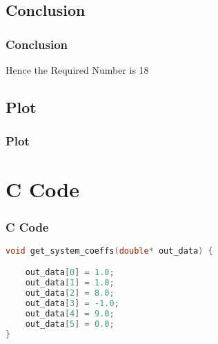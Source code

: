 \documentclass{beamer}
\theoremstyle{remark}
\numberwithin{equation}{section}
\begin{document}
\subsection{Conclusion}
\begin{frame}
\frametitle{Conclusion}
 Hence the Required Number is 18
\end{frame}
\subsection{Plot}
\begin{frame}[fragile]
\frametitle{Plot}
 
\end{frame}

\section{C Code}
\begin{frame}[fragile]
\frametitle{C Code}
\begin{lstlisting}[language=C]
void get_system_coeffs(double* out_data) {

    out_data[0] = 1.0;
    out_data[1] = 1.0;
    out_data[2] = 8.0;
    out_data[3] = -1.0;
    out_data[4] = 9.0;
    out_data[5] = 0.0;
}
    \end{lstlisting}
\end{frame}
\end{document}
